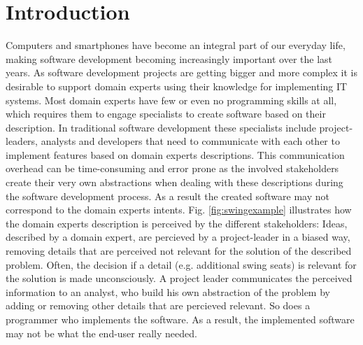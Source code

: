 \documentclass[runningheads,a4paper]{llncs}
\begin{document}
\section{Introduction}
Computers and smartphones have become an integral part of our everyday life, 
making software development becoming increasingly important over the last years.
As software development projects are getting bigger and more complex it is desirable to  
support domain experts using their knowledge for implementing IT systems.
Most domain experts have few or even no programming skills at all, which requires them to engage specialists to
create software based on their description. 
In traditional software development these specialists include project-leaders, analysts and developers that need 
to communicate with each other to implement features based on domain experts descriptions. 
This communication overhead can be time-consuming and error prone as the involved stakeholders
create their very own abstractions when dealing with these descriptions during the software development process.
As a result the created software may not correspond to the domain experts intents.
Fig. \ref{fig:swingexample} illustrates how the domain experts description is perceived by the different stakeholders:
Ideas, described by a domain expert, are percieved by a project-leader in a biased way, removing details that are perceived not relevant for the solution
of the described problem. Often, the decision if a detail (e.g. additional swing seats) is relevant for the solution is made unconsciously. 
A project leader communicates the perceived information to an analyst, who build his own abstraction of the problem by adding or removing other details
that are percieved relevant. So does a programmer who implements the software. As a result, the implemented software may not be what the end-user really needed.
\end{document}
